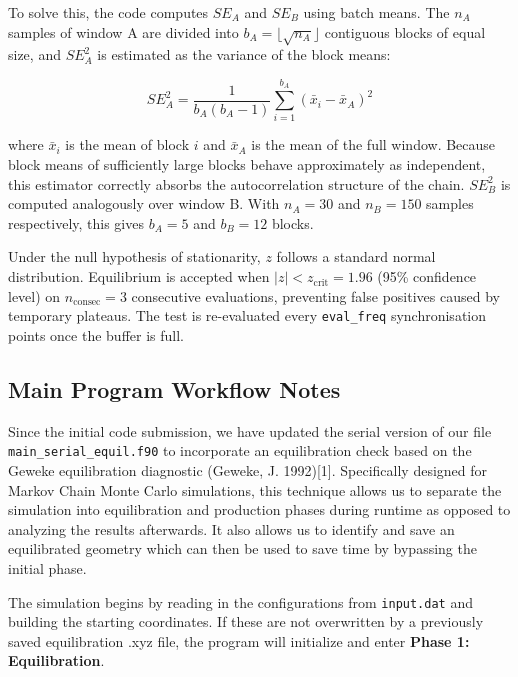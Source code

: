 \documentclass[
]{article}
\begin{document}
To solve this, the code computes \(SE_A\) and \(SE_B\) using batch
means. The \(n_A\) samples of window A are divided into
\(b_A = \lfloor\sqrt{n_A}\rfloor\) contiguous blocks of equal size, and
\(SE_A^2\) is estimated as the variance of the block means:

\[SE_A^2 = \frac{1}{b_A(b_A-1)}\sum_{i=1}^{b_A}\left(\bar{x}_i - \bar{x}_A\right)^2\]

where \(\bar{x}_i\) is the mean of block \(i\) and \(\bar{x}_A\) is the
mean of the full window. Because block means of sufficiently large
blocks behave approximately as independent, this estimator correctly
absorbs the autocorrelation structure of the chain. \(SE_B^2\) is
computed analogously over window B. With \(n_A = 30\) and \(n_B = 150\)
samples respectively, this gives \(b_A = 5\) and \(b_B = 12\) blocks.

Under the null hypothesis of stationarity, \(z\) follows a standard
normal distribution. Equilibrium is accepted when
\(|z| < z_{\text{crit}} = 1.96\) (95\% confidence level) on
\(n_{\text{consec}} = 3\) consecutive evaluations, preventing false
positives caused by temporary plateaus. The test is re-evaluated every
\texttt{eval\_freq} synchronisation points once the buffer is full.

\subsection{Main Program Workflow
Notes}\label{main-program-workflow-notes}

Since the initial code submission, we have updated the serial version of
our file \texttt{main\_serial\_equil.f90} to incorporate an
equilibration check based on the Geweke equilibration diagnostic
(Geweke, J. 1992){[}1{]}. Specifically designed for Markov Chain Monte
Carlo simulations, this technique allows us to separate the simulation
into equilibration and production phases during runtime as opposed to
analyzing the results afterwards. It also allows us to identify and save
an equilibrated geometry which can then be used to save time by
bypassing the initial phase.

The simulation begins by reading in the configurations from
\texttt{input.dat} and building the starting coordinates. If these are
not overwritten by a previously saved equilibration .xyz file, the
program will initialize and enter \textbf{Phase 1: Equilibration}.
\end{document}
